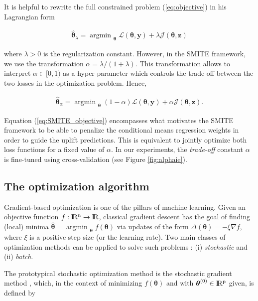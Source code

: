 \documentclass{article}
\def\z{\mathbf z}
\def\y{\mathbf y}
\def \real{\rm I\!R}
\DeclareMathOperator*{\argmin}{argmin~} %
\begin{document}
It is helpful to rewrite the full constrained problem (\ref{eq:objective}) in his Lagrangian form

\begin{align*}
    {\boldsymbol{\hat\theta}}_{\lambda} =  \argmin_{\boldsymbol{\theta}} \mathcal{L}(\boldsymbol{\theta}, \y) + \lambda \mathcal{J}(\boldsymbol{\theta}, \z)
\end{align*}

where $\lambda > 0$ is the regularization constant. However, in the SMITE framework, we use the transformation $\alpha = \lambda / (1+\lambda)$. This transformation allows to interpret $\alpha \in [0,1)$ as a hyper-parameter which controls the trade-off between the two losses in the optimization problem. Hence,

\begin{align}
    {\boldsymbol{\hat\theta}}_{\alpha} = \argmin_{\boldsymbol{\theta}} (1 - \alpha)  \mathcal{L}(\boldsymbol{\theta}, \y) + \alpha \mathcal{J}(\boldsymbol{\theta}, \z).
    \label{eq:SMITE_objective}
\end{align}

Equation (\ref{eq:SMITE_objective}) encompasses what motivates the SMITE framework to be able to penalize the conditional means regression weights in order to guide the uplift predictions. This is equivalent to jointly optimize both loss functions for a fixed value of $\alpha$. In our experiments, the {\it trade-off} constant $\alpha$ is fine-tuned using cross-validation (see Figure \ref{fig:alphaie}).


\subsection{The optimization algorithm}
\label{sec:smite_to_sgd}

Gradient-based optimization is one of the pillars of machine learning. Given an objective function $f: \real^n \rightarrow \real$, classical gradient descent has the goal of finding
(local) minima $\hat{\boldsymbol{\theta}} = \argmin_{\boldsymbol{\theta}} f(\boldsymbol{\theta})$ via updates of the form $ \Delta (\boldsymbol{\theta}) =  -\xi \nabla f$, where $\xi$
is a positive step size (or the learning rate). Two main classes of optimization methods can be applied to solve such problems : (i) {\it stochastic} and (ii) {\it batch}.

The prototypical stochastic optimization method is the stochastic gradient
method \citep{robbins1951stochastic}, which, in the context of minimizing $f(\boldsymbol{\theta})$ and with $\boldsymbol{\theta}^{(0)} \in \real^p$ given, is defined by
\end{document}
